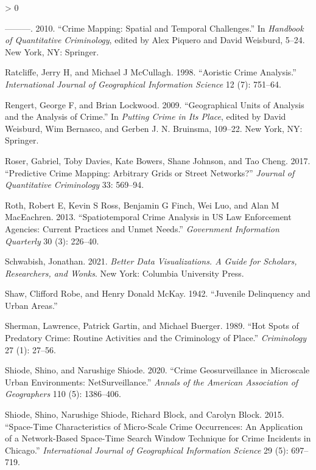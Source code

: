 \documentclass[
  krantz2]{krantz}
\newlength{\cslhangindent}
\newenvironment{CSLReferences}[2] %
 {%
  \setlength{\parindent}{0pt}
  \ifodd #1 \everypar{\setlength{\hangindent}{\cslhangindent}}\ignorespaces\fi
  \ifnum #2 > 0
  \setlength{\parskip}{#2\baselineskip}
  \fi
 }%
 {}
\begin{document}
\begin{CSLReferences}{1}{0}
\leavevmode\hypertarget{ref-Ratcliffe_2010}{}%
---------. 2010. {``Crime Mapping: Spatial and Temporal Challenges.''} In \emph{Handbook of Quantitative Criminology}, edited by Alex Piquero and David Weisburd, 5--24. New York, NY: Springer.

\leavevmode\hypertarget{ref-Ratcliffe_1998}{}%
Ratcliffe, Jerry H, and Michael J McCullagh. 1998. {``Aoristic Crime Analysis.''} \emph{International Journal of Geographical Information Science} 12 (7): 751--64.

\leavevmode\hypertarget{ref-Rengert_2009}{}%
Rengert, George F, and Brian Lockwood. 2009. {``Geographical Units of Analysis and the Analysis of Crime.''} In \emph{Putting Crime in Its Place}, edited by David Weisburd, Wim Bernasco, and Gerben J. N. Bruinsma, 109--22. New York, NY: Springer.

\leavevmode\hypertarget{ref-Rosser_2017}{}%
Roser, Gabriel, Toby Davies, Kate Bowers, Shane Johnson, and Tao Cheng. 2017. {``Predictive Crime Mapping: Arbitrary Grids or Street Networks?''} \emph{Journal of Quantitative Criminology} 33: 569--94.

\leavevmode\hypertarget{ref-Roth_2013}{}%
Roth, Robert E, Kevin S Ross, Benjamin G Finch, Wei Luo, and Alan M MacEachren. 2013. {``Spatiotemporal Crime Analysis in US Law Enforcement Agencies: Current Practices and Unmet Needs.''} \emph{Government Information Quarterly} 30 (3): 226--40.

\leavevmode\hypertarget{ref-Schwabish_2021}{}%
Schwabish, Jonathan. 2021. \emph{Better Data Visualizations. A Guide for Scholars, Researchers, and Wonks}. New York: Columbia University Press.

\leavevmode\hypertarget{ref-Shaw_1942}{}%
Shaw, Clifford Robe, and Henry Donald McKay. 1942. {``Juvenile Delinquency and Urban Areas.''}

\leavevmode\hypertarget{ref-Sherman_1989}{}%
Sherman, Lawrence, Patrick Gartin, and Michael Buerger. 1989. {``Hot Spots of Predatory Crime: Routine Activities and the Criminology of Place.''} \emph{Criminology} 27 (1): 27--56.

\leavevmode\hypertarget{ref-Shiode_2020}{}%
Shiode, Shino, and Narushige Shiode. 2020. {``Crime Geosurveillance in Microscale Urban Environments: NetSurveillance.''} \emph{Annals of the American Association of Geographers} 110 (5): 1386--406.

\leavevmode\hypertarget{ref-Shiode_2015}{}%
Shiode, Shino, Narushige Shiode, Richard Block, and Carolyn Block. 2015. {``Space-Time Characteristics of Micro-Scale Crime Occurrences: An Application of a Network-Based Space-Time Search Window Technique for Crime Incidents in Chicago.''} \emph{International Journal of Geographical Information Science} 29 (5): 697--719.


\end{CSLReferences}
\end{document}
